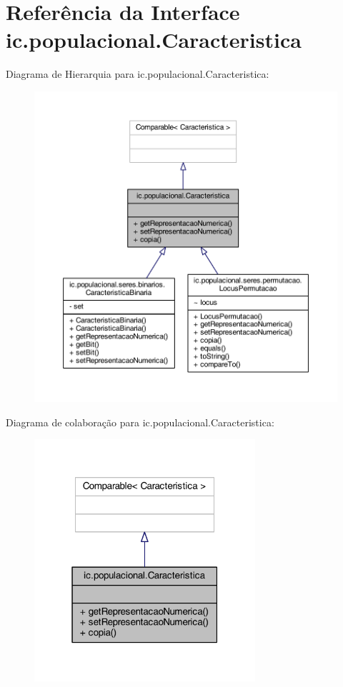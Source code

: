 \hypertarget{interfaceic_1_1populacional_1_1_caracteristica}{\section{Referência da Interface ic.\-populacional.\-Caracteristica}
\label{interfaceic_1_1populacional_1_1_caracteristica}
}


Diagrama de Hierarquia para ic.\-populacional.\-Caracteristica\-:
\nopagebreak
\begin{figure}[H]
\begin{center}
\leavevmode
\includegraphics[width=350pt]{interfaceic_1_1populacional_1_1_caracteristica__inherit__graph}
\end{center}
\end{figure}


Diagrama de colaboração para ic.\-populacional.\-Caracteristica\-:
\nopagebreak
\begin{figure}[H]
\begin{center}
\leavevmode
\includegraphics[width=232pt]{interfaceic_1_1populacional_1_1_caracteristica__coll__graph}
\end{center}
\end{figure}
